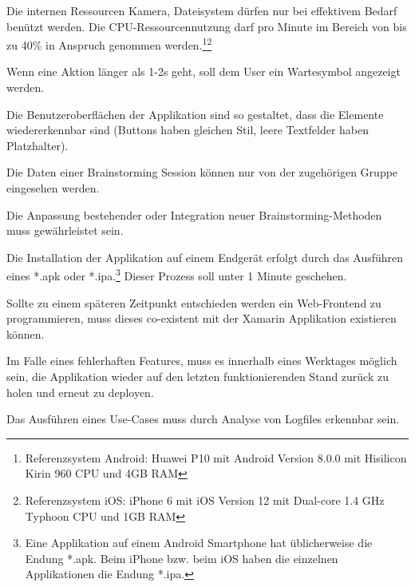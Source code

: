 \begin{description}[leftmargin=!,labelwidth=\widthof{\bfseries Wiederverwendbarkeit}]
	\item[Ressourcennutzung] Die internen Ressourcen Kamera, Dateisystem dürfen nur bei effektivem Bedarf benützt werden. Die CPU-Ressourcen\-nutzung darf pro Minute im Bereich von bis zu 40\% in Anspruch genommen werden.\footnote{Referenzsystem Android: Huawei P10 mit Android Version 8.0.0 mit Hisilicon Kirin 960 CPU und 4GB RAM}\footnote{Referenzsystem iOS: iPhone 6 mit iOS Version 12 mit Dual-core 1.4 GHz Typhoon CPU und 1GB RAM}
	
	\item[Bedienbarkeit] Wenn eine Aktion länger als 1-2s geht, soll dem User ein Wartesymbol angezeigt werden. 
	
	\item[Ästhetik] Die Benutzeroberflächen der Applikation sind so gestaltet, dass die Elemente wiedererkennbar sind (Buttons haben gleichen Stil, leere Textfelder haben Platzhalter). 
	
	\item[Vertraulichkeit] Die Daten einer Brainstorming Session können nur von der zugehörigen Gruppe eingesehen werden. 
	
	\item[Anpassbarkeit] Die Anpassung bestehender oder Integration neuer Brain\-storming-Methoden muss gewährleistet sein.
	
	\item[Installierbarkeit] Die Installation der Applikation auf einem Endgerät erfolgt durch das Ausführen eines *.apk oder *.ipa.\footnote{Eine Applikation auf einem Android Smartphone hat üblicherweise die Endung *.apk. Beim iPhone bzw. beim iOS haben die einzelnen Applikationen die Endung *.ipa.} Dieser Prozess soll unter 1 Minute geschehen.
	
	\item[Co-Existenz] Sollte zu einem späteren Zeitpunkt entschieden werden ein Web-Frontend zu programmieren, muss dieses co-existent mit der Xamarin Applikation existieren können.
	
	\item[Wiederherstellbarkeit] Im Falle eines fehlerhaften Features, muss es innerhalb eines Werktages möglich sein, die Applikation wieder auf den letzten funktionierenden Stand zurück zu holen und erneut zu deployen.
	
	\item[Analysierbarkeit] Das Ausführen eines Use-Cases muss durch Analyse von Logfiles erkennbar sein.
\end{description}
